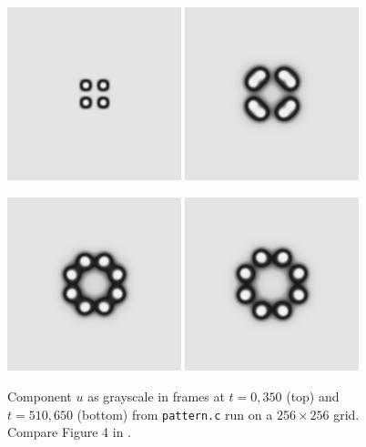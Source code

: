 \begin{figure}
\includegraphics[width=0.45\textwidth]{figs/pattern000} \quad
\includegraphics[width=0.45\textwidth]{figs/pattern350}

\medskip \medskip
\includegraphics[width=0.45\textwidth]{figs/pattern510} \quad
\includegraphics[width=0.45\textwidth]{figs/pattern650}
%    
\caption{Component $u$ as grayscale in frames at $t=0,350$ (top) and $t=510,650$ (bottom) from \texttt{pattern.c} run on a $256\times 256$ grid.  Compare Figure 4 in \citep{Pearson1993}.}
\label{fig:ts:pattern:figureversuspearson}
\end{figure}

